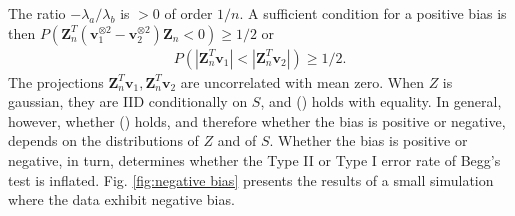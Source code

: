 \documentclass[12pt]{article}
\renewcommand{\P}{P}
\newcommand{\z}{Z}
\newcommand{\s}{S}
\newcommand{\zvec}{\vec{Z}_n}
\renewcommand{\vec}[1]{\textbf{#1}}
\newcommand{\eval}{\lambda}
\newcommand{\evec}{\vec{v}}
\begin{document}
      The ratio $-\eval_a/\eval_b$ is $>0$ of order $1/n$. A
      sufficient condition for a positive bias is then
      $\P(\zvec^T(\evec_1^{\otimes 2}-\evec_2^{\otimes 2})\zvec<0)\ge 1/2$
      or
      \begin{align}
        \P(|\zvec^T\evec_1|<|\zvec^T\evec_2|)\ge 1/2.\label{eqn:suff_cond}
      \end{align}
      The projections $\zvec^T\evec_1,\zvec^T\evec_2$ are uncorrelated
      with mean zero. When $\z$ is gaussian, they are IID
      conditionally on $\s$, and () holds with
      equality. In general, however, whether () %
      holds, and therefore whether the bias is positive or negative,
      depends on the distributions of $\z$ and of $\s$. Whether the
      bias is positive or negative, in turn, determines whether the
      Type II or Type I error rate of Begg's test is
      inflated. Fig. \ref{fig:negative bias} presents the results of a
      small simulation where the data exhibit negative bias.


\end{document}
